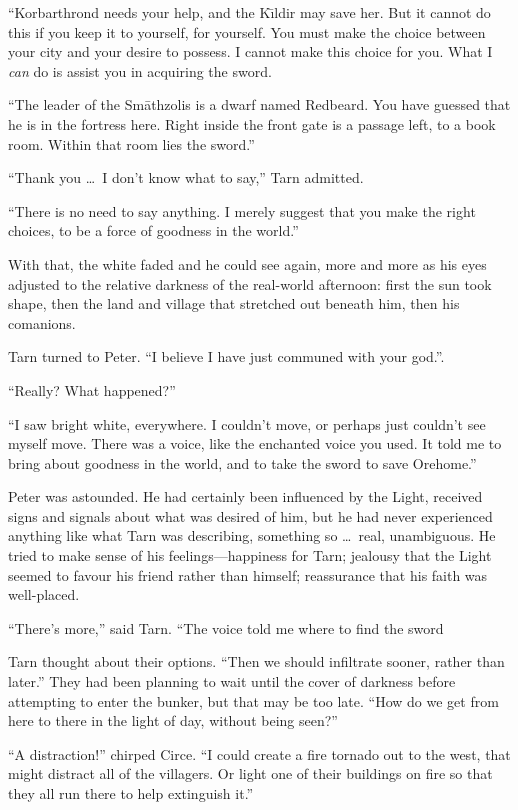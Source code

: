 ``Korbarthrond needs your help, and the K\=\i{}ldir may save her.  But it cannot do this if you keep it to yourself, for yourself.  You must make the choice between your city and your desire to possess.  I cannot make this choice for you.  What I \emph{can} do is assist you in acquiring the sword.

``The leader of the Sm\=athzolis is a dwarf named Redbeard. You have guessed that he is in the fortress here.  Right inside the front gate is a passage left, to a book room.  Within that room lies the sword.''

``Thank you \ldots\ I don't know what to say,'' Tarn admitted.

``There is no need to say anything.  I merely suggest that you make the right choices, to be a force of goodness in the world.''

With that, the white faded and he could see again, more and more as his eyes adjusted to the relative darkness of the real-world afternoon: first the sun took shape, then the land and village that stretched out beneath him, then his comanions.

Tarn turned to Peter. ``I believe I have just communed with your god.''.

``Really?  What happened?''

``I saw bright white, everywhere.  I couldn't move, or perhaps just couldn't see myself move. There was a voice, like the enchanted voice you used.  It told me to bring about goodness in the world, and to take the sword to save Orehome.''

Peter was astounded.  He had certainly been influenced by the Light, received signs and signals about what was desired of him, but he had never experienced anything like what Tarn was describing, something so \ldots\ real, unambiguous.  He tried to make sense of his feelings---happiness for Tarn; jealousy that the Light seemed to favour his friend rather than himself; reassurance that his faith was well-placed.

``There's more,'' said Tarn.  ``The voice told me where to find the sword




Tarn thought about their options.  ``Then we should infiltrate sooner, rather than later.''  They had been planning to wait until the cover of darkness before attempting to enter the bunker, but that may be too late.  ``How do we get from here to there in the light of day, without being seen?''

``A distraction!'' chirped Circe.  ``I could create a fire tornado out to the west, that might distract all of the villagers.  Or light one of their buildings on fire so that they all run there to help extinguish it.''
